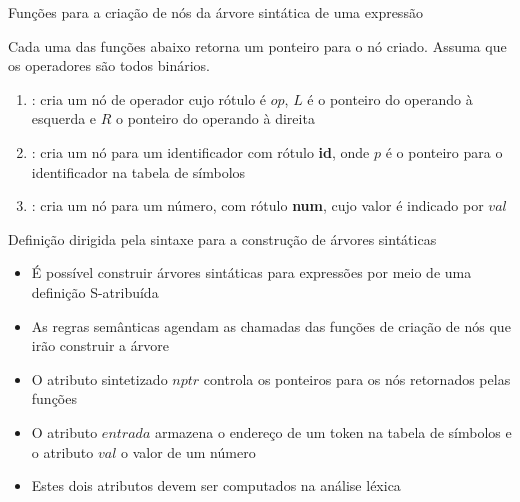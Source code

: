 \begin{frame}[fragile]{Funções para a criação de nós da árvore sintática de uma expressão}

    Cada uma das funções abaixo retorna um ponteiro para o nó criado. Assuma que os operadores são todos binários.
    \vspace{0.2in}
    \pause

    \begin{enumerate}
        \item {}: cria um nó de operador cujo rótulo é $op$, $L$ é o ponteiro do operando à esquerda e $R$ o ponteiro do operando à
            direita
        \pause

        \item {}: cria um nó para um identificador com rótulo \textbf{id}, onde $p$ é o ponteiro para o identificador na tabela 
            de símbolos
        \pause

        \item {}: cria um nó para um número, com rótulo \textbf{num}, cujo valor é indicado por $val$
    \end{enumerate}

\end{frame}



\begin{frame}[fragile]{Definição dirigida pela sintaxe para a construção de árvores sintáticas}

    \begin{itemize}
        \item É possível construir árvores sintáticas para expressões por meio de uma definição S-atribuída
        \pause

        \item As regras semânticas agendam as chamadas das funções de criação de nós que irão construir a árvore
        \pause

        \item O atributo sintetizado $nptr$ controla os ponteiros para os nós retornados pelas funções
        \pause

        \item O atributo $entrada$ armazena o endereço de um token na tabela de símbolos e o atributo $val$ o valor de um número
        \pause

        \item Estes dois atributos devem ser computados na análise léxica
    \end{itemize}

\end{frame}

